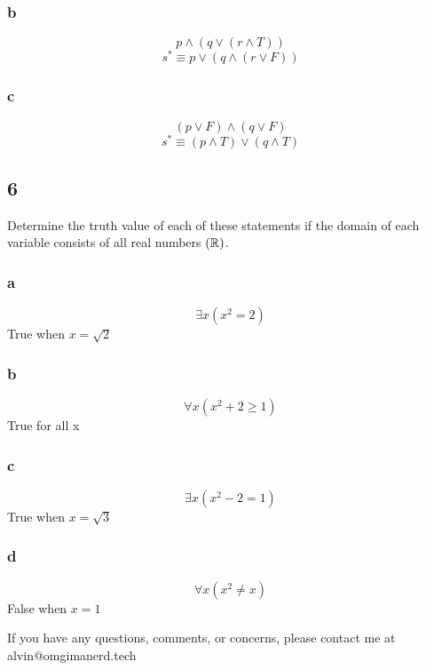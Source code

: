 \documentclass[letterpaper, 12pt]{math}
\begin{document}
\subsubsection*{b}
\[ p \wedge (q \vee (r \wedge T)) \]
\[ s^{*} \equiv p \vee (q \wedge (r \vee F)) \]

\subsubsection*{c}
\[ (p \vee F) \wedge (q \vee F) \]
\[ s^{*} \equiv (p \wedge T) \vee (q \wedge T) \]

\subsection*{6}
Determine the truth value of each of these statements if the domain of each
variable consists of all real numbers \( (\mathbb{R}) \).

\subsubsection*{a}
\[ \exists{x}(x^{2} = 2) \]
True when \( x = \sqrt{2} \)

\subsubsection*{b}
\[ \forall{x}(x^{2}+2 \geq 1) \]
True for all x

\subsubsection*{c}
\[ \exists{x}(x^{2}-2 = 1) \]
True when \( x = \sqrt{3} \)

\subsubsection*{d}
\[ \forall{x}(x^{2} \neq x) \]
False when \( x = 1 \)

\begin{center}
  If you have any questions, comments, or concerns, please contact me at
  alvin@omgimanerd.tech
\end{center}
\end{document}
